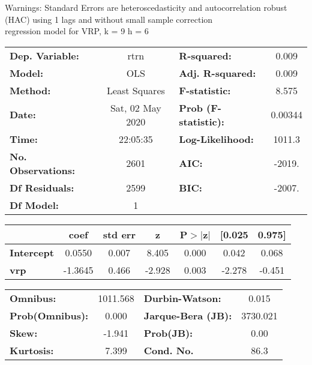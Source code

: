 Warnings: \newline
 [1] Standard Errors are heteroscedasticity and autocorrelation robust (HAC) using 1 lags and without small sample correction\\ 

regression model for VRP, k = 9 h = 6\begin{center}
\begin{tabular}{lclc}
\toprule
\textbf{Dep. Variable:}    &       rtrn       & \textbf{  R-squared:         } &     0.009   \\
\textbf{Model:}            &       OLS        & \textbf{  Adj. R-squared:    } &     0.009   \\
\textbf{Method:}           &  Least Squares   & \textbf{  F-statistic:       } &     8.575   \\
\textbf{Date:}             & Sat, 02 May 2020 & \textbf{  Prob (F-statistic):} &  0.00344    \\
\textbf{Time:}             &     22:05:35     & \textbf{  Log-Likelihood:    } &    1011.3   \\
\textbf{No. Observations:} &        2601      & \textbf{  AIC:               } &    -2019.   \\
\textbf{Df Residuals:}     &        2599      & \textbf{  BIC:               } &    -2007.   \\
\textbf{Df Model:}         &           1      & \textbf{                     } &             \\
\bottomrule
\end{tabular}
\begin{tabular}{lcccccc}
                   & \textbf{coef} & \textbf{std err} & \textbf{z} & \textbf{P$> |$z$|$} & \textbf{[0.025} & \textbf{0.975]}  \\
\midrule
\textbf{Intercept} &       0.0550  &        0.007     &     8.405  &         0.000        &        0.042    &        0.068     \\
\textbf{vrp}       &      -1.3645  &        0.466     &    -2.928  &         0.003        &       -2.278    &       -0.451     \\
\bottomrule
\end{tabular}
\begin{tabular}{lclc}
\textbf{Omnibus:}       & 1011.568 & \textbf{  Durbin-Watson:     } &    0.015  \\
\textbf{Prob(Omnibus):} &   0.000  & \textbf{  Jarque-Bera (JB):  } & 3730.021  \\
\textbf{Skew:}          &  -1.941  & \textbf{  Prob(JB):          } &     0.00  \\
\textbf{Kurtosis:}      &   7.399  & \textbf{  Cond. No.          } &     86.3  \\
\bottomrule
\end{tabular}
\end{center}

